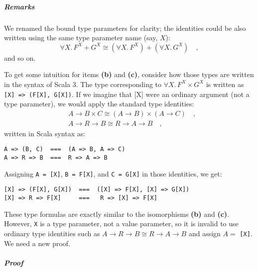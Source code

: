 \subparagraph{Remarks}

We renamed the bound type parameters for clarity; the identities could
be also written using the same type parameter name (say, $X$):
\[
\forall X.\,F^{X}+G^{X}\cong(\forall X.\,F^{X})+(\forall X.\,G^{X})\quad,
\]
and so on.

To get some intuition for items \textbf{(b)} and \textbf{(c)}, consider
how those types are written in the syntax of Scala 3. The type corresponding
to $\forall X.\,F^{X}\times G^{X}$ is written as \lstinline![X] => (F[X], G[X])!.
If we imagine that {[}X{]} were an ordinary argument (not a type parameter),
we would apply the standard type identities:
\begin{align*}
 & A\rightarrow B\times C\cong(A\rightarrow B)\times(A\rightarrow C)\quad,\\
 & A\rightarrow R\rightarrow B\cong R\rightarrow A\rightarrow B\quad,
\end{align*}
written in Scala syntax as:
\begin{lstlisting}
A => (B, C)  ===  (A => B, A => C)
A => R => B  ===  R => A => B
\end{lstlisting}
Assigning \lstinline!A = [X]!, \lstinline!B = F[X]!, and \lstinline!C = G[X]!
in those identities, we get:
\begin{lstlisting}
[X] => (F[X], G[X])  ===  ([X] => F[X], [X] => G[X])
[X] => R => F[X]     ===   R => [X] => F[X]
\end{lstlisting}
These type formulas are exactly similar to the isomorphisms \textbf{(b)}
and \textbf{(c)}. However, \lstinline!X! is a type parameter, not
a value parameter, so it is invalid to use ordinary type identities
such as $A\rightarrow R\rightarrow B\cong R\rightarrow A\rightarrow B$
and assign $A=$ \lstinline![X]!. We need a new proof. 

\subparagraph{Proof}

